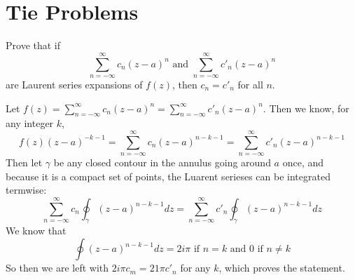 \documentclass[12pt]{article}
\begin{document}
% 
%

\section*{Tie Problems}


\begin{statement}[1]
  Prove that if 
  $$ \sum^{\infty}_{n=-\infty} c_n(z-a)^n \text{ and } \sum^{\infty}_{n=-\infty} c'_n(z-a)^n $$
  are Laurent series expansions of $f(z)$, then $c_n=c'_n$ for all $n$.
\end{statement}
\begin{newproof}
  Let $f(z)=\sum^{\infty}_{n=-\infty} c_n(z-a)^n=\sum^{\infty}_{n=-\infty} c'_n(z-a)^n$. Then we know, for any integer $k$,  
  \begin{equation*}
    f(z)(z-a)^{-k-1}=\sum^{\infty}_{n=-\infty} c_n(z-a)^{n-k-1}=\sum^{\infty}_{n=-\infty} c'_n(z-a)^{n-k-1}
  \end{equation*}
  Then let $\gamma$ be any closed contour in the annulus going around $a$ once, and because it is a compact set 
  of points, the Luarent serieses can be integrated termwise:
  \begin{equation*}
    \sum^{\infty}_{n=-\infty}c_n \oint_{\gamma} (z-a)^{n-k-1}dz=\sum^{\infty}_{n=-\infty}c'_n \oint_{\gamma} (z-a)^{n-k-1}dz
  \end{equation*}
  We know that 
  \begin{equation*}
    \oint(z-a)^{n-k-1}dz = 2i\pi \text{ if } n=k \text{ and } 0 \text{ if } n \neq k
  \end{equation*}
  So then we are left with $2i\pi c_m = 21\pi c'_n$ for any $k$, which proves the statement.
\end{newproof}

\end{document}
